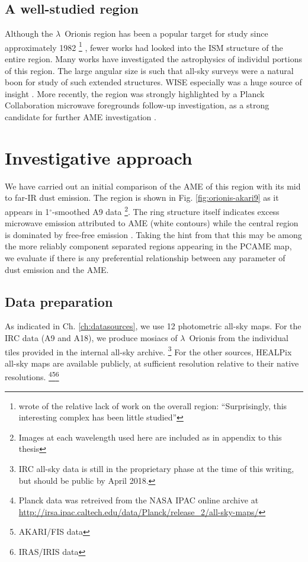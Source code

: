   \subsection{A well-studied region}
    Although the $\lambda$~Orionis region has been a popular target for study since approximately 1982
    \footnote{\cite{duerr82} wrote of the relative lack of work on the overall region: ``Surprisingly, this interesting complex has been little studied''}
    , fewer works had looked into the ISM structure of the entire region.  Many works have investigated the astrophysics of individul portions of this region. The large angular size is such that all-sky surveys were a natural boon for study of such extended structures. WISE especially was a huge source of insight \citep{koenig15}. More recently, the region was strongly highlighted by a Planck Collaboration microwave foregrounds follow-up investigation, as a strong candidate for further AME investigation \citep{planck15XXV}.


	\section{Investigative approach}
      We have carried out an initial comparison of the AME of this region with its mid to far-IR dust emission. The region is shown in Fig. \ref{fig:orionis-akari9} as it appears in 1$^{\circ}$-smoothed A9 data
      \footnote{Images at each wavelength used here are included as in appendix to this thesis}.
       The ring structure itself indicates excess microwave emission attributed to AME (white contours) while the central region is dominated by free-free emission \citep{aran09, koenig15,planck15XXV}. Taking the hint from \cite{planck15XXV} that this may be among the more reliably component separated regions appearing in the PCAME map, we evaluate if there is any preferential relationship between any parameter of dust emission and the AME.

		\subsection{Data preparation}
			As indicated in Ch. \hyperref[ch:datasources]{\ref{ch:datasources}}, we use 12 photometric all-sky maps. For the IRC data (A9 and A18), we produce mosiacs of $\lambda$~Orionis from the individual tiles provided in the internal all-sky archive.
      \footnote{IRC all-sky data is still in the proprietary phase at the time of this writing, but should be public by April 2018.}
       For the other sources, HEALPix all-sky maps are available publicly, at sufficient resolution relative to their native resolutions. \footnote{Planck data was retreived from the NASA IPAC online archive at \url{http://irsa.ipac.caltech.edu/data/Planck/release_2/all-sky-maps/}}\footnote{AKARI/FIS data }\footnote{IRAS/IRIS data }

